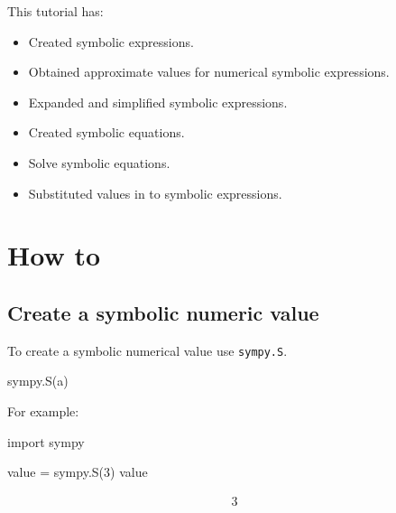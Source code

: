 \begin{note}
This tutorial has:
\begin{itemize}
\item 

Created symbolic expressions.

\item 

Obtained approximate values for numerical symbolic expressions.

\item 

Expanded and simplified symbolic expressions.

\item 

Created symbolic equations.

\item 

Solve symbolic equations.

\item 

Substituted values in to symbolic expressions.

\end{itemize}
\end{note}

\section{How to}

\subsection{Create a symbolic numeric value}

To create a symbolic numerical value use \texttt{sympy.S}.

\begin{api}
sympy.S(a)
\end{api}


For example:




\begin{pyin}
import sympy

value = sympy.S(3)
value
\end{pyin}




\begin{equation*}
\begin{split}\displaystyle 3\end{split}
\end{equation*}

